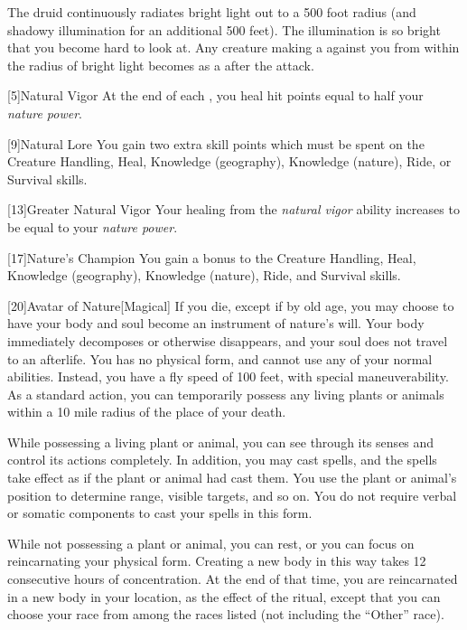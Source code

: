         The druid continuously radiates bright light out to a 500 foot radius (and shadowy illumination for an additional 500 feet).
        The illumination is so bright that you become hard to look at.
        Any creature making a  against you from within the radius of bright light becomes \dazzled as a  after the attack.

        [5]{Natural Vigor}
        At the end of each , you heal hit points equal to half your \textit{nature power}.

        [9]{Natural Lore}
        You gain two extra skill points which must be spent on the Creature Handling, Heal, Knowledge (geography), Knowledge (nature), Ride, or Survival skills.

        [13]{Greater Natural Vigor}
        Your healing from the \textit{natural vigor} ability increases to be equal to your \textit{nature power}.

        [17]{Nature's Champion}
        You gain a  bonus to the Creature Handling, Heal, Knowledge (geography), Knowledge (nature), Ride, and Survival skills.

        [20]{Avatar of Nature}[Magical]
        If you die, except if by old age, you may choose to have your body and soul become an instrument of nature's will.
        Your body immediately decomposes or otherwise disappears, and your soul does not travel to an afterlife.
        You has no physical form, and cannot use any of your normal abilities.
        Instead, you have a fly speed of 100 feet, with special maneuverability.
        As a standard action, you can temporarily possess any living plants or animals within a 10 mile radius of the place of your death.

        While possessing a living plant or animal, you can see through its senses and control its actions completely.
        In addition, you may cast spells, and the spells take effect as if the plant or animal had cast them.
        You use the plant or animal's position to determine range, visible targets, and so on.
        You do not require verbal or somatic components to cast your spells in this form.

        While not possessing a plant or animal, you can rest, or you can focus on reincarnating your physical form.
        Creating a new body in this way takes 12 consecutive hours of concentration.
        At the end of that time, you are reincarnated in a new body in your location, as the effect of the  ritual, except that you can choose your race from among the races listed (not including the ``Other'' race).

